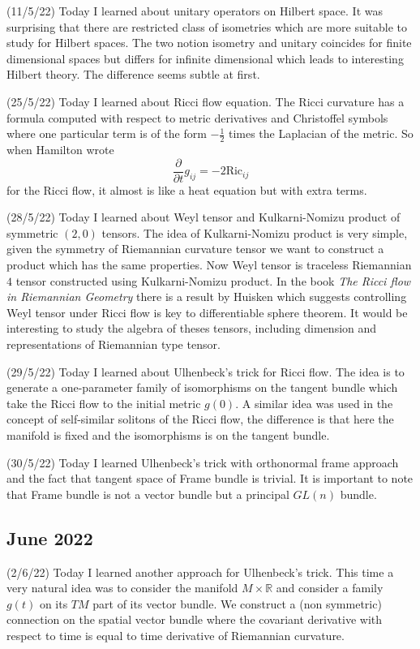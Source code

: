 \documentclass[12pt,a4paper]{article}
\newcommand{\R}{\mathbb{R}}
\newcommand{\dt}{\frac{\partial}{\partial t}}
\begin{document}
(11/5/22) Today I learned about unitary operators on Hilbert space. It was surprising that there are restricted class of isometries which are more suitable to study for Hilbert spaces. The two notion isometry and unitary coincides for finite dimensional spaces but differs for infinite dimensional which leads to interesting Hilbert theory. The difference seems subtle at first.
	
(25/5/22) Today I learned about Ricci flow equation. The Ricci curvature has a formula computed with respect to metric derivatives and Christoffel symbols where one particular term is of the form $-\frac{1}{2}$ times the Laplacian of the metric. So when Hamilton wrote 
	\[ \dt g_{ij} = -2\text{Ric}_{ij} \]
for the Ricci flow, it almost is like a heat equation but with extra terms.
	
(28/5/22) Today I learned about Weyl tensor and Kulkarni-Nomizu product of symmetric $(2,0)$ tensors. The idea of Kulkarni-Nomizu product is very simple, given the symmetry of Riemannian curvature tensor we want to construct a product which has the same properties. Now Weyl tensor is traceless Riemannian $4$ tensor constructed using Kulkarni-Nomizu product. In the book \textit{The Ricci flow in Riemannian Geometry} there is a result by Huisken which suggests controlling Weyl tensor under Ricci flow is key to differentiable sphere theorem. It would be interesting to study the algebra of theses tensors, including dimension and representations of Riemannian type tensor.
	
(29/5/22) Today I learned about Ulhenbeck's trick for Ricci flow. The idea is to generate a one-parameter family of isomorphisms on the tangent bundle which take the Ricci flow to the initial metric $g(0)$. A similar idea was used in the concept of self-similar solitons of the Ricci flow, the difference is that here the manifold is fixed and the isomorphisms is on the tangent bundle.
	
(30/5/22) Today I learned Ulhenbeck's trick with orthonormal frame approach and the fact that tangent space of Frame bundle is trivial. It is important to note that Frame bundle is not a vector bundle but a principal $GL(n)$ bundle.
		
\subsection*{June 2022}
	
	
\quad (2/6/22) Today I learned another approach for Ulhenbeck's trick. This time a very natural idea was to consider the manifold $M \times \R$ and consider a family $g(t)$ on its $TM$ part of its vector bundle. We construct a (non symmetric) connection on the spatial vector bundle where the covariant derivative with respect to time is equal to time derivative of Riemannian curvature.
	
\end{document}
